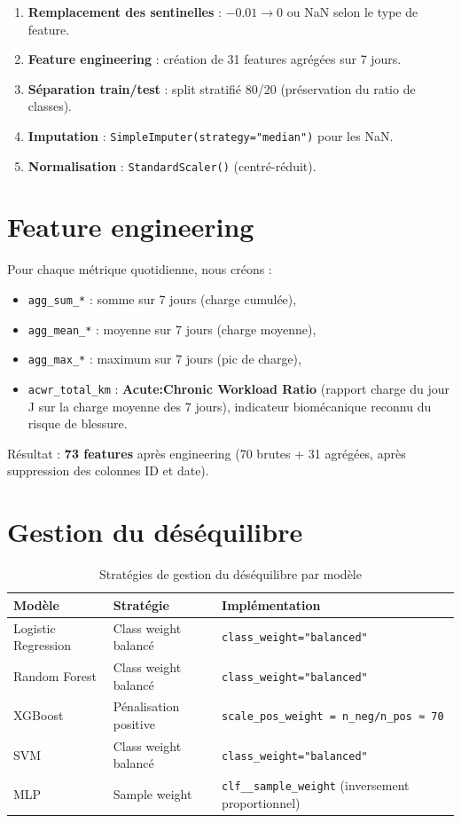 \documentclass[12pt,a4paper]{report}
\begin{document}
\begin{enumerate}
  \item \textbf{Remplacement des sentinelles} : $-0.01 \rightarrow 0$ ou NaN selon le type de feature.
  \item \textbf{Feature engineering} : création de 31 features agrégées sur 7 jours.
  \item \textbf{Séparation train/test} : split stratifié 80/20 (préservation du ratio de classes).
  \item \textbf{Imputation} : \texttt{SimpleImputer(strategy="median")} pour les NaN.
  \item \textbf{Normalisation} : \texttt{StandardScaler()} (centré-réduit).
\end{enumerate}

\section{Feature engineering}

Pour chaque métrique quotidienne, nous créons :
\begin{itemize}
  \item \texttt{agg\_sum\_*} : somme sur 7 jours (charge cumulée),
  \item \texttt{agg\_mean\_*} : moyenne sur 7 jours (charge moyenne),
  \item \texttt{agg\_max\_*} : maximum sur 7 jours (pic de charge),
  \item \texttt{acwr\_total\_km} : \textbf{Acute:Chronic Workload Ratio} (rapport charge du
        jour J sur la charge moyenne des 7 jours), indicateur biomécanique reconnu du risque de blessure.
\end{itemize}

Résultat : \textbf{73 features} après engineering (70 brutes + 31 agrégées, après suppression
des colonnes ID et date).

\section{Gestion du déséquilibre}

\begin{table}[H]
\centering
\begin{tabular}{lll}
\toprule
\textbf{Modèle} & \textbf{Stratégie} & \textbf{Implémentation} \\
\midrule
Logistic Regression & Class weight balancé & \texttt{class\_weight="balanced"} \\
Random Forest & Class weight balancé & \texttt{class\_weight="balanced"} \\
XGBoost & Pénalisation positive & \texttt{scale\_pos\_weight = n\_neg/n\_pos ≈ 70} \\
SVM & Class weight balancé & \texttt{class\_weight="balanced"} \\
MLP & Sample weight & \texttt{clf\_\_sample\_weight} (inversement proportionnel) \\
\bottomrule
\end{tabular}
\caption{Stratégies de gestion du déséquilibre par modèle}
\end{table}
\end{document}
